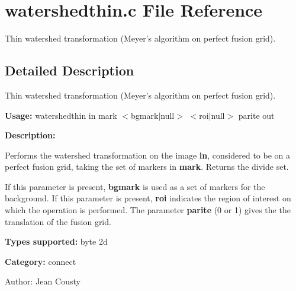 \section{watershedthin.c File Reference}
\label{watershedthin_8c}
Thin watershed transformation (Meyer's algorithm on perfect fusion grid). 



\subsection{Detailed Description}
Thin watershed transformation (Meyer's algorithm on perfect fusion grid). 

{\bf Usage:} watershedthin in mark $<$bgmark$|$null$>$ $<$roi$|$null$>$ parite out

{\bf Description:}

Performs the watershed transformation on the image {\bf in}, considered to be on a perfect fusion grid, taking the set of markers in {\bf mark}. Returns the divide set.

If this parameter is present, {\bf bgmark} is used as a set of markers for the background. If this parameter is present, {\bf roi} indicates the region of interest on which the operation is performed. The parameter {\bf parite} (0 or 1) gives the the translation of the fusion grid.

{\bf Types supported:} byte 2d

{\bf Category:} connect

\begin{Desc}
\item[Author:]Jean Cousty \end{Desc}
